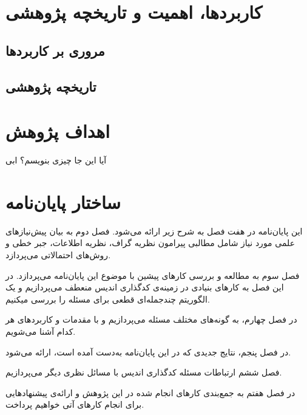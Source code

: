 	
\section{
	کاربردها، اهمیت و تاریخچه پژوهشی
	}
\subsection{
	مروری بر کاربردها
}

\subsection{
تاریخچه پژوهشی
}

\section{اهداف پژوهش}
آیا این جا چیزی بنویسم؟ ابی

\section{ساختار پایان‌نامه}

این پایان‌نامه در هفت فصل به شرح زیر ارائه می‌شود.
فصل دوم به بیان پیش‌نیازهای علمی مورد نیاز شامل مطالبی پیرامون نظریه گراف، نظریه اطلاعات، جبر خطی و روش‌های احتمالاتی  می‌پردازد.

فصل سوم به مطالعه و بررسی کارهای پیشین با موضوع این پایان‌نامه می‌پردازد. در این فصل به کارهای بنیادی 
در زمینه‌ی کدگذاری اندیس منعطف می‌پردازیم و یک الگوریتم چندجمله‌ای قطعی برای مسئله را بررسی میکنیم.

در فصل چهارم، به گونه‌های مختلف مسئله می‌پردازیم و با مقدمات و کاربردهای هر کدام آشنا می‌شویم.

در فصل پنجم، نتایج جدیدی که در این پایان‌نامه به‌دست آمده است، ارائه می‌شود.

فصل ششم ارتباطات مسئله کدگذاری اندیس با مسائل نظری دیگر می‌پردازیم.

در فصل هفتم به جمع‌بندی کارهای انجام شده در این پژوهش و ارائه‌ی پیشنهادهایی برای انجام کارهای آتی خواهیم پرداخت.